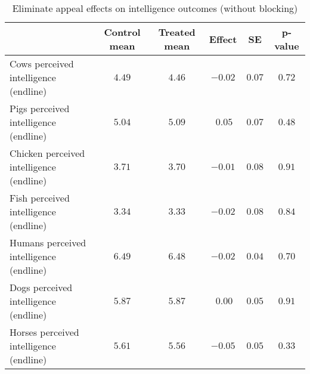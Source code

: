 \begin{table*}[ht]
\caption{Eliminate appeal effects on intelligence outcomes (without blocking)\label{round}} 
\begin{center}
\begin{tabular}{lccccc}
\hline\hline
\multicolumn{1}{l}{}&\multicolumn{1}{c}{Control mean}&\multicolumn{1}{c}{Treated mean}&\multicolumn{1}{c}{Effect}&\multicolumn{1}{c}{SE}&\multicolumn{1}{c}{p-value}\tabularnewline
\hline
Cows perceived intelligence (endline)&$4.49$&$4.46$&$-0.02$&$0.07$&$0.72$\tabularnewline
Pigs perceived intelligence (endline)&$5.04$&$5.09$&$~0.05$&$0.07$&$0.48$\tabularnewline
Chicken perceived intelligence (endline)&$3.71$&$3.70$&$-0.01$&$0.08$&$0.91$\tabularnewline
Fish perceived intelligence (endline)&$3.34$&$3.33$&$-0.02$&$0.08$&$0.84$\tabularnewline
Humans perceived intelligence (endline)&$6.49$&$6.48$&$-0.02$&$0.04$&$0.70$\tabularnewline
Dogs perceived intelligence (endline)&$5.87$&$5.87$&$~0.00$&$0.05$&$0.91$\tabularnewline
Horses perceived intelligence (endline)&$5.61$&$5.56$&$-0.05$&$0.05$&$0.33$\tabularnewline
\hline
\end{tabular}\end{center}

\end{table*}

